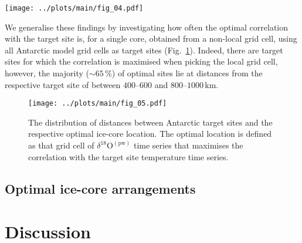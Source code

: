\documentclass[cp, manuscript]{copernicus}
\begin{document}
\begin{figure*}[t]%
\centering
\texttt{[image: ../plots/main/fig\_04.pdf]}
\caption[Picking optimal sites]{%
  Picking ice core sites that optimally reconstruct interannual temperatures at
  EDML and Vostok. The maps show the correlation in the model data between the
  interannual temperature time series at the target sites (black crosses) EDML
  (\textbf{a}--\textbf{c}) and Vostok (\textbf{d}--\textbf{f}) with the fields
  of precipitation-weighted oxygen isotope composition. Filled black circles
  denote those grid cells that maximise the correlation with the target site
  temperature for choosing either a single grid cell ($N=1$; \textbf{a},
  \textbf{d}) or for averaging across $N=3$ (\textbf{b}, \textbf{e}) or $N=5$
  (\textbf{c}, \textbf{f}) grid cells.}
\label{fig:picking}%
\end{figure*}%

We generalise these findings by investigating how often the optimal correlation
with the target site is, for a single core, obtained from a non-local grid cell,
using all Antarctic model grid cells as target sites
(Fig.~\ref{fig:picking.hist}). Indeed, there are target sites for which the
correlation is maximised when picking the local grid cell, however, the majority
($\sim65$\,\%) of optimal sites lie at distances from the respective target site
of between $400$--$600$ and $800$--$1000$\,km.

\begin{figure}[t]%
\centering
\texttt{[image: ../plots/main/fig\_05.pdf]}
\caption{%
  The distribution of distances between Antarctic target sites and the
  respective optimal ice-core location. The optimal location is defined as that
  grid cell of $\delta^{18}\mathrm{O}^{\mathrm{(pw)}}$ time series that
  maximises the correlation with the target site temperature time series.}
\label{fig:picking.hist}%
\end{figure}%

\subsection{Optimal ice-core arrangements}
\label{results:optim-spacing}



\section{Discussion}\label{discussion}
\end{document}
